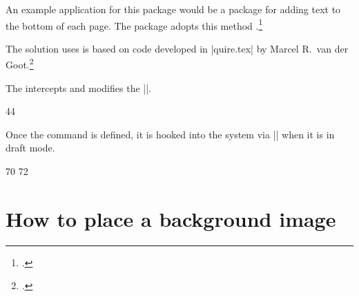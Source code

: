 An example application for this package would be a package for
 adding text to the bottom of each page.
 The   package adopts this method \citep{prelim2e}.\footcite{prelim2e}

The solution  uses is based on code developed in  |quire.tex| by
 Marcel R.~van der Goot.\footcite{quire}  

The   intercepts and modifies the ||. 

\begin{teX}
44 \newcommand{\@Prelim@EveryShipout}{%
45 \bgroup
46 \dimen\z@=\wd\@cclv
47 \dimen\@ne=\ht\@cclv
48 \dimen\tw@=\dp\@cclv
49 \dimen\thr@@=\dimen1
50 \advance\dimen\thr@@ by \dimen\tw@
51 \global\setbox\@cclv\vbox to \dimen\thr@@{%
52 \hb@xt@\dimen\z@{%
53 \box\@cclv%
54 \hss
55 }%
\end{teX}
To this we append the text produced by |\PrelimText|. It is put in a |\vbox to 0pt|
in which a |\hbox| to the width of |\box255| is included, in which |\PrelimText| is set.
We have to reset |\protect| because it is set to |\noexpand| by the output routine.

\begin{teXXX}
56 \vbox to \z@{%
57   \hb@xt@\dimen\z@{%
58     \let\protect\relax
59     \hfill\PrelimText\hfill
60   }%
61   \vss
62 }%
63   \vss
64 }%
\end{teXXX}

Finally we set the dimensions of |\box255| to the values they had before |\@Prelim@EveryShipout|.

\begin{teX}
65 \wd\@cclv=\dimen\z@
66 \ht\@cclv=\dimen\@ne
67 \dp\@cclv=\dimen\tw@
68 \egroup
69}
\end{teX}

Once the command is defined, it is hooked into the system via |\EveryShipout| when it is in draft mode. 

\begin{teX}
70  \EveryShipout{\@Prelim@EveryShipout}
72 \fi
\end{teX}

\section{How to place a background image}

